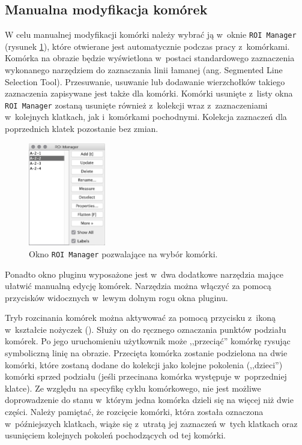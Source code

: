 \documentclass[declaration,shortabstract,mgr]{iithesis}
\begin{document}
\subsection{Manualna modyfikacja komórek}
\label{sec:user-manual-modifications}

W celu manualnej modyfikacji komórki należy wybrać ją w~oknie \texttt{ROI Manager} (rysunek \ref{fig:ui-roi-manager}), które otwierane jest automatycznie podczas pracy z~komórkami.
Komórka na obrazie będzie wyświetlona w~postaci standardowego zaznaczenia wykonanego narzędziem do zaznaczania linii łamanej (ang. Segmented Line Selection Tool)\cite{imagej:segmented-line}.
Przesuwanie, usuwanie lub dodawanie wierzchołków takiego zaznaczenia zapisywane jest także dla komórki.
Komórki usunięte z~listy okna \texttt{ROI Manager} zostaną usunięte również z~kolekcji wraz z~zaznaczeniami w~kolejnych klatkach, jak i~komórkami pochodnymi.
Kolekcja zaznaczeń dla poprzednich klatek pozostanie bez zmian.

\begin{figure}
  \centering
  \includegraphics[width=0.3\textwidth]{images/ui-roi-manager.png}
  \caption{Okno \texttt{ROI Manager} pozwalające na wybór komórki.}
  \label{fig:ui-roi-manager}
\end{figure}

Ponadto okno pluginu wyposażone jest w~dwa dodatkowe narzędzia mające ułatwić manualną edycję komórek. Narzędzia można włączyć za pomocą przycisków widocznych w~lewym dolnym rogu okna pluginu.

Tryb rozcinania komórek można aktywować za pomocą przycisku z~ikoną w~kształcie nożyczek ().
Służy on do ręcznego oznaczania punktów podziału komórek. Po jego uruchomieniu użytkownik może ,,przeciąć'' komórkę rysując symboliczną linię na obrazie.
Przecięta komórka zostanie podzielona na dwie komórki, które zostaną dodane do kolekcji jako kolejne pokolenia (,,dzieci'') komórki sprzed podziału (jeśli przecinana komórka występuje w~poprzedniej klatce).
Ze względu na specyfikę cyklu komórkowego, nie jest możliwe doprowadzenie do stanu w~którym jedna komórka dzieli się na więcej niż dwie części.
Należy pamiętać, że rozcięcie komórki, która została oznaczona w~późniejszych klatkach, wiąże się z~utratą jej zaznaczeń w~tych klatkach oraz usunięciem kolejnych pokoleń pochodzących od tej komórki.
\end{document}

